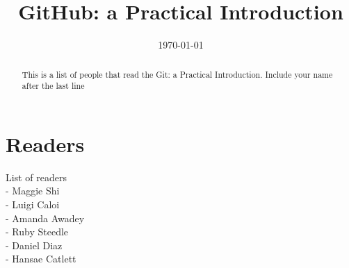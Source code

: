 \documentclass[12pt]{article}
\begin{document}
\title{GitHub: a Practical Introduction} 

\date{\today}

\maketitle 

\begin{abstract} 

	This is a list of people that read the Git: a Practical Introduction. Include your name after the last line
	
\end{abstract}

\section{Readers}
List of readers \\
- Maggie Shi \\
- Luigi Caloi  \\
- Amanda Awadey \\
- Ruby Steedle \\
- Daniel Diaz \\
- Hansae Catlett
	 
\end{document}
